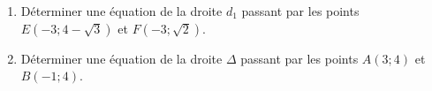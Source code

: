 
\begin{enumerate}
\item Déterminer une équation de la droite $d_1$ passant par les points $E(-3;4-\sqrt{3})$ et $F(-3;\sqrt{2})$.
\item Déterminer une équation de la droite $\Delta$ passant par les points $A(3;4)$ et $B(-1;4)$.
\end{enumerate}